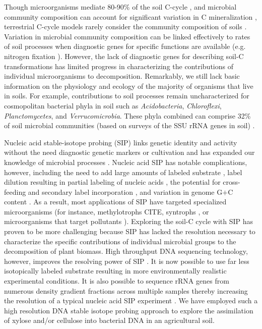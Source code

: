 Though microorganisms mediate 80-90\% of the soil C-cycle
\citep{ColemanCrossley_1996,Nannipieri_2003}, and microbial community
composition can account for significant variation in C mineralization
\citep{Strickland_2009}, terrestrial C-cycle models rarely consider the
community composition of soils \citep{Zak2006,Reed2007}. Variation in microbial
community composition can be linked effectively to rates of soil processes when
diagnostic genes for specific functions are available (e.g. nitrogen fixation
\citep{Hsu2009}).  However, the lack of diagnostic genes for describing soil-C
transformations has limited progress in characterizing the contributions of
individual microorganisms to decomposition. Remarkably, we still lack basic
information on the physiology and ecology of the majority of organisms that
live in soils. For example, contributions to soil processes remain
uncharacterized for cosmopolitan bacterial phyla in soil such as
\textit{Acidobacteria}, \textit{Chloroflexi}, \textit{Planctomycetes}, and
\textit{Verrucomicrobia}. These phyla combined can comprise 32\% of soil
microbial communities (based on surveys of the SSU rRNA genes in soil)
\citep{Janssen2006,Buckley2002}. 

Nucleic acid stable-isotope probing (SIP) links genetic identity and activity
without the need diagnostic genetic markers or cultivation and has expanded our
knowledge of microbial processes
\citep{Chen_Murrell_2010}. Nucleic acid SIP has notable complications, however,
including the need to add large amounts of labeled substrate
\citep{radajewski2000stable}, label dilution resulting in partial labeling of
nucleic acids \citep{radajewski2000stable}, the potential for cross-feeding and
secondary label incorporation \citep{DeRito2005}, and variation in genome G$+$C
content \citep{Buckley_2007}.  As a result, most applications of SIP have
targeted specialized microorganisms (for instance, methylotrophs CITE, syntrophs
\citep{lueders2004}, or microorganisms that target pollutants
\citep{derito2005}). Exploring the soil-C cycle with SIP has proven to be more
challenging because SIP has lacked the resolution necessary to characterize the
specific contributions of individual microbial groups to the decomposition of
plant biomass. High throughput DNA sequencing technology, however, improves the
resolving power of SIP \citep{Aoyagi2015}. It is now possible to use far less
isotopically labeled substrate resulting in more environmentally realistic
experimental conditions. It is also possible to sequence rRNA genes from
numerous density gradient fractions across multiple samples thereby increasing
the resolution of a typical nucleic acid SIP experiment
\citep{Verastegui_2014}.  We have employed such a high resolution DNA stable
isotope probing approach to explore the assimilation of xylose and/or cellulose
into bacterial DNA in an agricultural soil. 


